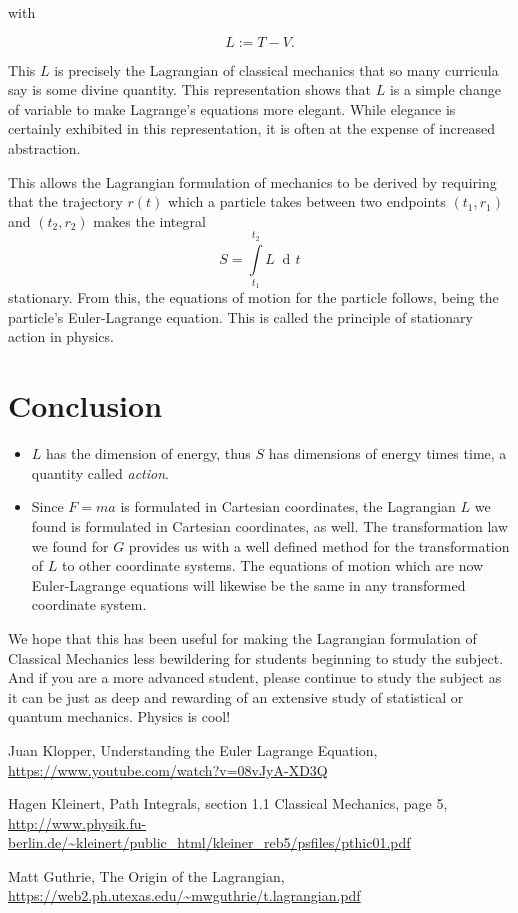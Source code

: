 \documentclass{article}
\DeclareMathOperator{\dd}{d\!}
\begin{document}
with

\begin{equation}
 L := T-V.
\end{equation}

This $L$ is precisely the Lagrangian of classical mechanics that so many curricula say is some divine quantity. This representation shows that $L$ is a simple change of variable to make Lagrange's equations more elegant. While elegance is certainly exhibited in this representation, it is often at the expense of increased abstraction.

This allows the Lagrangian formulation of mechanics to be derived by requiring that the trajectory $r(t)$ which a particle takes between two endpoints $(t_1,r_1)$ and $(t_2,r_2)$ makes the integral
\begin{equation}
S=\int\limits_{t_1}^{t_2} L \; \dd t
\end{equation}
stationary. From this, the equations of motion for the particle follows, being the particle's Euler-Lagrange equation. This is called the principle of stationary action in physics. \\

\section{Conclusion}

\begin{itemize}
\item $L$ has the dimension of energy, thus $S$ has dimensions of energy times time, a quantity called \emph{action}.
\item Since $F=ma$ is formulated in Cartesian coordinates, the Lagrangian $L$ we found is formulated in Cartesian coordinates, as well. The transformation law we found for $G$ provides us with a well defined method for the transformation of $L$ to other coordinate systems. The equations of motion which are now Euler-Lagrange equations will likewise be the same in any transformed coordinate system.
\end{itemize}

We hope that this has been useful for making the Lagrangian formulation of Classical Mechanics less bewildering for students beginning to study the subject. And if you are a more advanced student, please continue to study the subject as it can be just as deep and rewarding of an extensive study of statistical or quantum mechanics. Physics is cool!


\begin{thebibliography}{9}

 Juan Klopper, Understanding the Euler Lagrange Equation, \url{https://www.youtube.com/watch?v=08vJyA-XD3Q}

 Hagen Kleinert, Path Integrals, section 1.1 Classical Mechanics, page 5, \url{http://www.physik.fu-berlin.de/~kleinert/public_html/kleiner_reb5/psfiles/pthic01.pdf}

 Matt Guthrie, The Origin of the Lagrangian, \url{https://web2.ph.utexas.edu/~mwguthrie/t.lagrangian.pdf}

\end{thebibliography}
\end{document}
